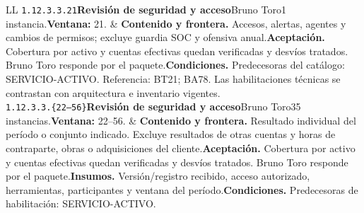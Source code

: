 \begin{longtable}{L{\tabcolsep\relax}L{\tabcolsep\relax}}
\texttt{1.\allowbreak{}12.\allowbreak{}3.\allowbreak{}3.\allowbreak{}21}\newline{}\textbf{Revisión de seguridad y acceso}\newline{}Bruno Toro\newline{}1 instancia.\newline{}\textbf{Ventana:} 21. & \textbf{Contenido y frontera.} Accesos, alertas, agentes y cambios de permisos; excluye guardia SOC y ofensiva anual.\newline{}\textbf{Aceptación.} Cobertura por activo y cuentas efectivas quedan verificadas y desvíos tratados. Bruno Toro responde por el paquete.\newline{}\textbf{Condiciones.} Predecesoras del catálogo: SERVICIO-ACTIVO. Referencia: BT21; BA78. Las habilitaciones técnicas se contrastan con arquitectura e inventario vigentes.\\\hline
\texttt{1.\allowbreak{}12.\allowbreak{}3.\allowbreak{}3.\allowbreak{}\{22--56\}}\newline{}\textbf{Revisión de seguridad y acceso}\newline{}Bruno Toro\newline{}35 instancias.\newline{}\textbf{Ventana:} 22--56. & \textbf{Contenido y frontera.} Resultado individual del período o conjunto indicado. Excluye resultados de otras cuentas y horas de contraparte, obras o adquisiciones del cliente.\newline{}\textbf{Aceptación.} Cobertura por activo y cuentas efectivas quedan verificadas y desvíos tratados. Bruno Toro responde por el paquete.\newline{}\textbf{Insumos.} Versión/registro recibido, acceso autorizado, herramientas, participantes y ventana del período.\newline{}\textbf{Condiciones.} Predecesoras de habilitación: SERVICIO-ACTIVO.\\\hline

\end{longtable}
